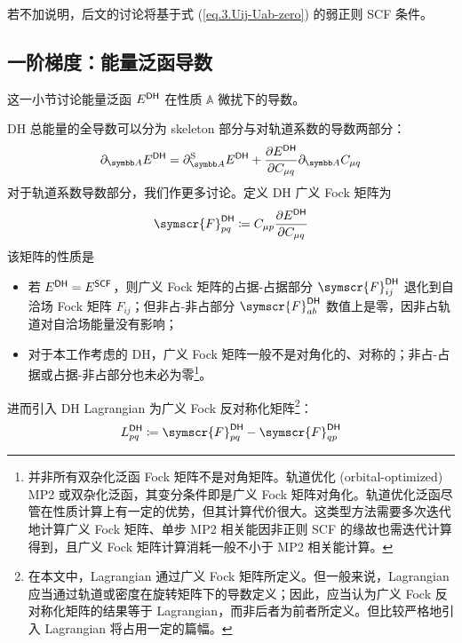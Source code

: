 若不加说明，后文的讨论将基于式 (\ref{eq.3.Uij-Uab-zero}) 的弱正则 SCF 条件。

\subsection{一阶梯度：能量泛函导数}

这一小节讨论能量泛函 $E^{\textsf{DH}}$ 在性质 $\mathbb{A}$ 微扰下的导数。

DH 总能量的全导数可以分为 skeleton 部分与对轨道系数的导数两部分：
\begin{equation}
    \label{eq.3.def.pdA-DH-0}
    \partial_\mathbb{A} E^\textmt{DH} = \partial_\mathbb{A}^\mathrm{S} E^\textmt{DH} + \frac{\partial E^\textmt{DH}}{\partial C_{\mu q}} \partial_\mathbb{A} C_{\mu q}
\end{equation}
对于轨道系数导数部分，我们作更多讨论。定义 DH 广义 Fock 矩阵为
\begin{equation}
    \label{eq.3.def.generalized-fock}
    \symscr{F}_{pq}^\textmt{DH} \coloneq C_{\mu p} \frac{\partial E^\textmt{DH}}{\partial C_{\mu q}}
\end{equation}
该矩阵的性质是
\begin{itemize}[nosep]
    \item 若 $E^{\textsf{DH}} = E^{\textsf{SCF}}$，则广义 Fock 矩阵的占据-占据部分 $\symscr{F}_{ij}^\textmt{DH}$ 退化到自洽场 Fock 矩阵 $F_{ij}$；但非占-非占部分 $\symscr{F}_{ab}^\textmt{DH}$ 数值上是零，因非占轨道对自洽场能量没有影响；
    \item 对于本工作考虑的 DH，广义 Fock 矩阵一般不是对角化的、对称的；非占-占据或占据-非占部分也未必为零\footnote{并非所有双杂化泛函 Fock 矩阵不是对角矩阵。轨道优化 (orbital-optimized) MP2 或双杂化泛函，其变分条件即是广义 Fock 矩阵对角化\cite{Bozkaya-Sherrill.JCP.2011}。轨道优化泛函尽管在性质计算上有一定的优势\cite{Hait-Head-Gordon.JCP.2018}，但其计算代价很大。这类型方法需要多次迭代地计算广义 Fock 矩阵、单步 MP2 相关能因非正则 SCF 的缘故也需迭代计算得到，且广义 Fock 矩阵计算消耗一般不小于 MP2 相关能计算。}。
\end{itemize}
进而引入 DH Lagrangian 为广义 Fock 反对称化矩阵\footnote{在本文中，Lagrangian 通过广义 Fock 矩阵所定义。但一般来说，Lagrangian 应当通过轨道或密度在旋转矩阵下的导数定义\cite{Helgaker-Jorgensen.Wiley.2013}；因此，应当认为广义 Fock 反对称化矩阵的结果等于 Lagrangian，而非后者为前者所定义。但比较严格地引入 Lagrangian 将占用一定的篇幅。}：
\begin{equation}
    \label{eq.3.def.lagrangian}
    L_{pq}^\textmt{DH} \coloneq \symscr{F}_{pq}^\textmt{DH} - \symscr{F}_{qp}^\textmt{DH}
\end{equation}
